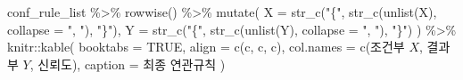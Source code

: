 \documentclass[
]{book}
\newenvironment{Shaded}{\begin{snugshade}}{\end{snugshade}}
\newcommand{\AttributeTok}[1]{\textcolor[rgb]{0.77,0.63,0.00}{#1}}
\newcommand{\ConstantTok}[1]{\textcolor[rgb]{0.00,0.00,0.00}{#1}}
\newcommand{\FunctionTok}[1]{\textcolor[rgb]{0.00,0.00,0.00}{#1}}
\newcommand{\NormalTok}[1]{#1}
\newcommand{\SpecialCharTok}[1]{\textcolor[rgb]{0.00,0.00,0.00}{#1}}
\newcommand{\StringTok}[1]{\textcolor[rgb]{0.31,0.60,0.02}{#1}}
\begin{document}
\begin{Shaded}
\begin{Highlighting}[]
\NormalTok{conf\_rule\_list }\SpecialCharTok{\%\textgreater{}\%}
  \FunctionTok{rowwise}\NormalTok{() }\SpecialCharTok{\%\textgreater{}\%}
  \FunctionTok{mutate}\NormalTok{(}
    \AttributeTok{X =} \FunctionTok{str\_c}\NormalTok{(}\StringTok{"\{"}\NormalTok{, }\FunctionTok{str\_c}\NormalTok{(}\FunctionTok{unlist}\NormalTok{(X), }\AttributeTok{collapse =} \StringTok{", "}\NormalTok{), }\StringTok{"\}"}\NormalTok{),}
    \AttributeTok{Y =} \FunctionTok{str\_c}\NormalTok{(}\StringTok{"\{"}\NormalTok{, }\FunctionTok{str\_c}\NormalTok{(}\FunctionTok{unlist}\NormalTok{(Y), }\AttributeTok{collapse =} \StringTok{", "}\NormalTok{), }\StringTok{"\}"}\NormalTok{)}
\NormalTok{  ) }\SpecialCharTok{\%\textgreater{}\%}
\NormalTok{  knitr}\SpecialCharTok{::}\FunctionTok{kable}\NormalTok{(}
    \AttributeTok{booktabs =} \ConstantTok{TRUE}\NormalTok{,}
    \AttributeTok{align =} \FunctionTok{c}\NormalTok{(}\StringTok{\textquotesingle{}c\textquotesingle{}}\NormalTok{, }\StringTok{\textquotesingle{}c\textquotesingle{}}\NormalTok{, }\StringTok{\textquotesingle{}c\textquotesingle{}}\NormalTok{),}
    \AttributeTok{col.names =} \FunctionTok{c}\NormalTok{(}\StringTok{\textquotesingle{}조건부 $X$\textquotesingle{}}\NormalTok{, }\StringTok{\textquotesingle{}결과부 $Y$\textquotesingle{}}\NormalTok{, }\StringTok{\textquotesingle{}신뢰도\textquotesingle{}}\NormalTok{),}
    \AttributeTok{caption =} \StringTok{\textquotesingle{}최종 연관규칙\textquotesingle{}}
\NormalTok{  )}
\end{Highlighting}
\end{Shaded}
\end{document}

